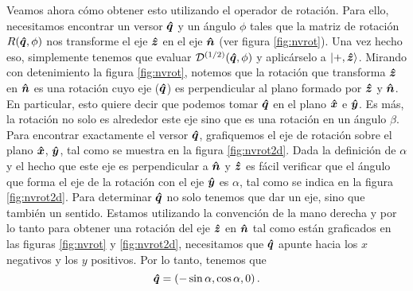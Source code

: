 \documentclass[10pt, a4paper]{article}
\numberwithin{equation}{subsection}
\begin{document}
Veamos ahora cómo obtener esto utilizando el operador de rotación. Para ello,
necesitamos encontrar un versor $\vu*{q}$ y un ángulo $\phi$ tales que la
matriz de rotación $R(\vu*{q}, \phi)$ nos transforme el eje $\vu*{z}$ en el
eje $\vu*{n}$ (ver figura \ref{fig:nvrot}). Una vez hecho eso, simplemente
tenemos que evaluar $\RotationOp[1/2](\vers{q}, \phi)$ y aplicárselo a
$\ket{+,\vu*{z}}$. Mirando con detenimiento la figura \ref{fig:nvrot}, notemos
que la rotación que transforma $\vu*{z}$ en $\vu*{n}$ es una rotación cuyo
eje ($\vu*{q}$) es perpendicular al plano formado por $\vu*{z}$ y $\vu*{n}$.
En particular, esto quiere decir que podemos tomar $\vu*{q}$ en el plano
$\vu*{x}$ e $\vu*{y}$. Es más, la rotación no solo es alrededor este eje sino
que es una rotación en un ángulo $\beta$. Para encontrar exactamente el versor
$\vu*{q}$, grafiquemos el eje de rotación sobre el plano $\vu*{x}$,
$\vu*{y}$, tal como se muestra en la figura \ref{fig:nvrot2d}. Dada la
definición de $\alpha$ y el hecho que este eje es perpendicular a $\vu*{n}$ y
$\vu*{z}$ es fácil verificar que el ángulo que forma el eje de la rotación con
el eje $\vu*{y}$ es $\alpha$, tal como se indica en la figura
\ref{fig:nvrot2d}. Para determinar $\vu*{q}$ no solo tenemos que dar un eje,
sino que también un sentido. Estamos utilizando la convención de la mano
derecha y por lo tanto para obtener una rotación del eje $\vu*{z}$ en
$\vu*{n}$ tal como están graficados en las figuras \ref{fig:nvrot} y
\ref{fig:nvrot2d}, necesitamos que $\vu*{q}$ apunte hacia los $x$ negativos y
los $y$ positivos. Por lo tanto, tenemos que
\begin{equation}
  \vu*{q} = \left(-\sin\alpha, \cos\alpha, 0\right).
\end{equation}

\bigbreak
{}
\bigbreak
\end{document}
